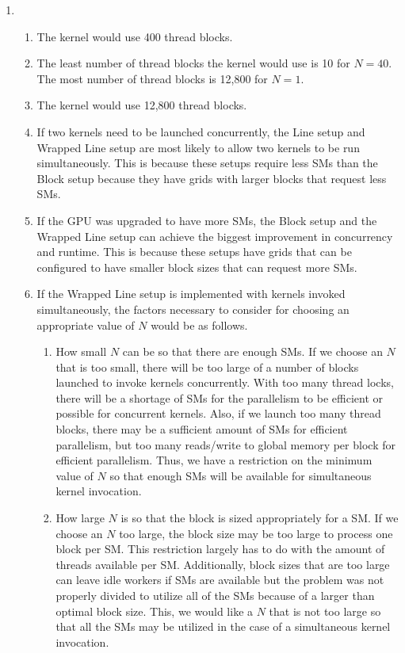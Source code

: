 \documentclass[11pt]{article}
\begin{document}
\begin{enumerate}[leftmargin=0.9in]
    \item %
        \begin{enumerate}
            \item The kernel would use 400 thread blocks.
            \item The least number of thread blocks the kernel would use is 10 for $N = 40$. The most number of thread blocks is 12,800 for $N = 1$.
            \item The kernel would use 12,800 thread blocks.
            \item If two kernels need to be launched concurrently, the Line setup and Wrapped Line setup are most likely to allow two kernels to be run simultaneously. This is because these setups require less SMs than the Block setup because they have grids with larger blocks that request less SMs.
            \item If the GPU was upgraded to have more SMs, the Block setup and the Wrapped Line setup can achieve the biggest improvement in concurrency and runtime. This is because these setups have grids that can be configured to have smaller block sizes that can request more SMs.
            \item If the Wrapped Line setup is implemented with kernels invoked simultaneously, the factors necessary to consider for choosing an appropriate value of $N$ would be as follows.
                \begin{enumerate}
                    \item How small $N$ can be so that there are enough SMs. If we choose an $N$ that is too small, there will be too large of a number of blocks launched to invoke kernels concurrently. With too many thread locks, there will be a shortage of SMs for the parallelism to be efficient or possible for concurrent kernels. Also, if we launch too many thread blocks, there may be a sufficient amount of SMs for efficient parallelism, but too many reads/write to global memory per block for efficient parallelism. Thus, we have a restriction on the minimum value of $N$ so that enough SMs will be available for simultaneous kernel invocation.
                    \item How large $N$ is so that the block is sized appropriately for a SM. If we choose an $N$ too large, the block size may be too large to process one block per SM. This restriction largely has to do with the amount of threads available per SM. Additionally, block sizes that are too large can leave idle workers if SMs are available but the problem was not properly divided to utilize all of the SMs because of a larger than optimal block size. This, we would like a $N$ that is not too large so that all the SMs may be utilized in the case of a simultaneous kernel invocation.
                \end{enumerate}
        \end{enumerate}
\end{enumerate} %
\end{document}
